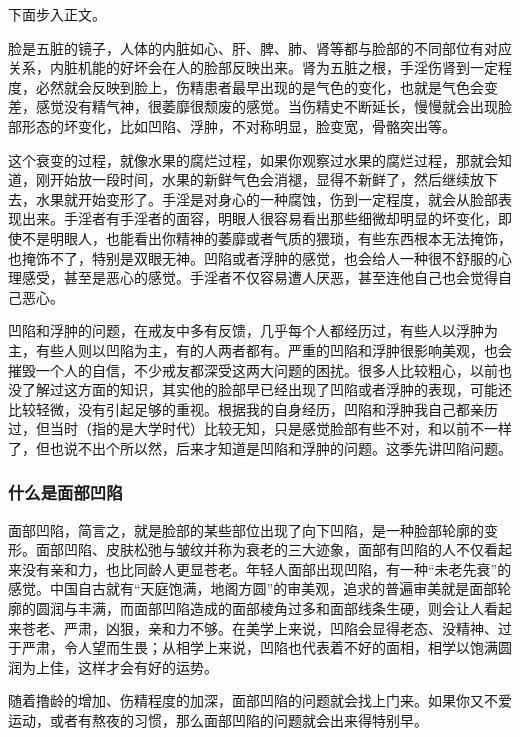 下面步入正文。

脸是五脏的镜子，人体的内脏如心、肝、脾、肺、肾等都与脸部的不同部位有对应关系，内脏机能的好坏会在人的脸部反映出来。肾为五脏之根，手淫伤肾到一定程度，必然就会反映到脸上，伤精患者最早出现的是气色的变化，也就是气色会变差，感觉没有精气神，很萎靡很颓废的感觉。当伤精史不断延长，慢慢就会出现脸部形态的坏变化，比如凹陷、浮肿，不对称明显，脸变宽，骨骼突出等。

这个衰变的过程，就像水果的腐烂过程，如果你观察过水果的腐烂过程，那就会知道，刚开始放一段时间，水果的新鲜气色会消褪，显得不新鲜了，然后继续放下去，水果就开始变形了。手淫是对身心的一种腐蚀，伤到一定程度，就会从脸部表现出来。手淫者有手淫者的面容，明眼人很容易看出那些细微却明显的坏变化，即使不是明眼人，也能看出你精神的萎靡或者气质的猥琐，有些东西根本无法掩饰，也掩饰不了，特别是双眼无神。凹陷或者浮肿的感觉，也会给人一种很不舒服的心理感受，甚至是恶心的感觉。手淫者不仅容易遭人厌恶，甚至连他自己也会觉得自己恶心。

凹陷和浮肿的问题，在戒友中多有反馈，几乎每个人都经历过，有些人以浮肿为主，有些人则以凹陷为主，有的人两者都有。严重的凹陷和浮肿很影响美观，也会摧毁一个人的自信，不少戒友都深受这两大问题的困扰。很多人比较粗心，以前也没了解过这方面的知识，其实他的脸部早已经出现了凹陷或者浮肿的表现，可能还比较轻微，没有引起足够的重视。根据我的自身经历，凹陷和浮肿我自己都亲历过，但当时（指的是大学时代）比较无知，只是感觉脸部有些不对，和以前不一样了，但也说不出个所以然，后来才知道是凹陷和浮肿的问题。这季先讲凹陷问题。

\subsubsection{什么是面部凹陷}

面部凹陷，简言之，就是脸部的某些部位出现了向下凹陷，是一种脸部轮廓的变形。面部凹陷、皮肤松弛与皱纹并称为衰老的三大迹象，面部有凹陷的人不仅看起来没有亲和力，也比同龄人更显苍老。年轻人面部出现凹陷，有一种“未老先衰”的感觉。中国自古就有“天庭饱满，地阁方圆”的审美观，追求的普遍审美就是面部轮廓的圆润与丰满，而面部凹陷造成的面部棱角过多和面部线条生硬，则会让人看起来苍老、严肃，凶狠，亲和力不够。在美学上来说，凹陷会显得老态、没精神、过于严肃，令人望而生畏；从相学上来说，凹陷也代表着不好的面相，相学以饱满圆润为上佳，这样才会有好的运势。

随着撸龄的增加、伤精程度的加深，面部凹陷的问题就会找上门来。如果你又不爱运动，或者有熬夜的习惯，那么面部凹陷的问题就会出来得特别早。


